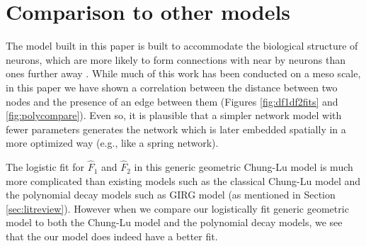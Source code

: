 \documentclass[11]{article}
\newcommand{\hlfix}[2]{\texthl{#1}\todo{#2}}
\theoremstyle{remark}
\theoremstyle{definition}
\begin{document}
\section{Comparison to other models \label{sec:othermodels}}

The model built in this paper is built to accommodate the biological structure of neurons, which are more likely to form connections with near by neurons than ones further away \cite{connectometutorial, spatialfor, spatialagainst}. While much of this work has been conducted on a meso scale, in this paper  we have shown a correlation between the distance between two nodes and the presence of an edge between them (Figures \ref{fig:df1df2fits} and \ref{fig:polycompare}). Even so, it is plausible that a simpler network model with fewer parameters generates the network which is later embedded spatially in a more optimized way (e.g., like a spring network).

The logistic fit for $\hat F_1$ and $\hat F_2$ in this generic geometric Chung-Lu model is much more complicated than existing models such as the classical Chung-Lu model and the polynomial decay models such as GIRG model (as mentioned in Section \ref{sec:litreview}).
However when we compare our logistically fit generic geometric model to both the Chung-Lu model and the polynomial decay models, we see that the our model does indeed have a better fit. 





\end{document}

